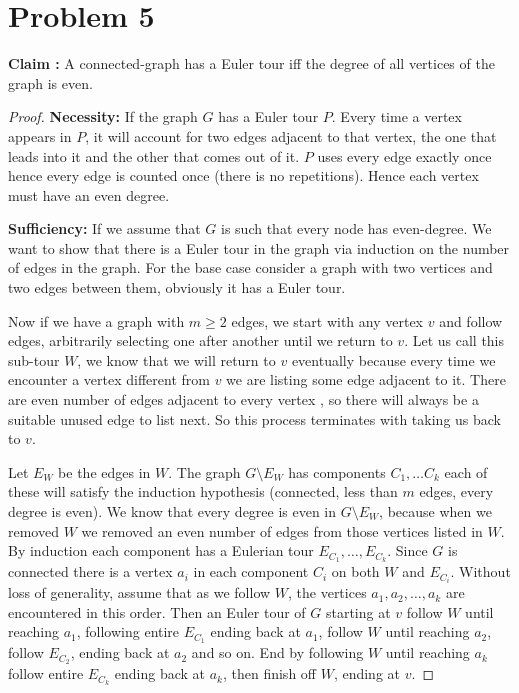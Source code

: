 \documentclass{article}
\numberwithin{equation}{section}
\begin{document}
\section*{Problem 5}
\textbf{Claim :} A connected-graph has a Euler tour iff the degree of all vertices of the graph is even. 
\begin{proof}
    \textbf{Necessity:} If the graph $G$ has a Euler tour $P$. Every time a vertex appears in $P$, it will account for two edges adjacent to that vertex, the one that leads into it and the other that comes out of it. $P$ uses every edge exactly once hence every edge is counted once (there is no repetitions). Hence each vertex must have an even degree. 

    \textbf{Sufficiency:} If we assume that $G$ is such that every node has even-degree. We want to show that there is a Euler tour in the graph via induction on the number of edges in the graph. For the base case consider a graph with two vertices and two edges between them, obviously it has a Euler tour.

    Now if we have a graph with $m\ge 2$ edges, we start with any vertex $v$ and follow edges, arbitrarily selecting one after another until we return to $v$. Let us call this sub-tour $W$, we know that we will return to $v$ eventually because every time we encounter a vertex different from $v$ we are listing some edge adjacent to it. There are even number of edges adjacent to every vertex , so there will always be a suitable unused edge to list next. So this process terminates with taking us back to $v$. 

    Let $E_W$  be the edges in $W$. The graph $G\setminus E_W$ has components $C_1, \dots C_k$ each of these will satisfy the induction hypothesis (connected, less than $m$ edges, every degree is even). We know that every degree is even in $G\setminus E_W$, because when we removed $W$ we removed an even number of edges from those vertices listed in $W$. By induction each component has a Eulerian tour $E_{C_1}, \dots, E_{C_k}$. Since $G$ is connected there is a vertex $a_i$ in each component $C_i$ on both $W$ and $E_{C_i}$. Without loss of generality, assume that as we follow $W$, the vertices $a_1, a_2, \dots, a_k$ are encountered in this order. Then an Euler tour of $G$ starting at $v$ follow $W$ until reaching $a_1$, following entire $E_{C_1}$ ending back at $a_1$, follow $W$ until reaching $a_2$, follow $E_{C_2}$, ending back at $a_2$ and so on. End by following $W$ until reaching $a_k$ follow entire $E_{C_k}$ ending back at $a_k$, then finish off $W$, ending at $v$. 
\end{proof}
\end{document}
